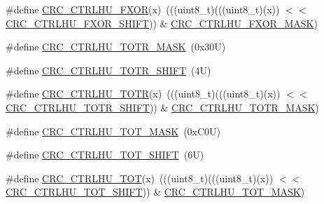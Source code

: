 \begin{DoxyCompactItemize}
\item 
\#define \mbox{\hyperlink{group___c_r_c___register___masks_ga807b19953a7dae113ae149901d5bc58d}{C\+R\+C\+\_\+\+C\+T\+R\+L\+H\+U\+\_\+\+F\+X\+OR}}(x)~(((uint8\+\_\+t)(((uint8\+\_\+t)(x)) $<$$<$ \mbox{\hyperlink{group___c_r_c___register___masks_ga505ca51d1aad1610b44bad4580f2637f}{C\+R\+C\+\_\+\+C\+T\+R\+L\+H\+U\+\_\+\+F\+X\+O\+R\+\_\+\+S\+H\+I\+FT}})) \& \mbox{\hyperlink{group___c_r_c___register___masks_ga0a552f60712b28cd96e939d4324157df}{C\+R\+C\+\_\+\+C\+T\+R\+L\+H\+U\+\_\+\+F\+X\+O\+R\+\_\+\+M\+A\+SK}})
\item 
\#define \mbox{\hyperlink{group___c_r_c___register___masks_ga0418249380c6e69fc9a949f8da4e60f1}{C\+R\+C\+\_\+\+C\+T\+R\+L\+H\+U\+\_\+\+T\+O\+T\+R\+\_\+\+M\+A\+SK}}~(0x30\+U)
\item 
\#define \mbox{\hyperlink{group___c_r_c___register___masks_ga991fefda83335d188d0cc82f1e64f43e}{C\+R\+C\+\_\+\+C\+T\+R\+L\+H\+U\+\_\+\+T\+O\+T\+R\+\_\+\+S\+H\+I\+FT}}~(4\+U)
\item 
\#define \mbox{\hyperlink{group___c_r_c___register___masks_ga93d5a2251369091d34c8cca12d716c2b}{C\+R\+C\+\_\+\+C\+T\+R\+L\+H\+U\+\_\+\+T\+O\+TR}}(x)~(((uint8\+\_\+t)(((uint8\+\_\+t)(x)) $<$$<$ \mbox{\hyperlink{group___c_r_c___register___masks_ga991fefda83335d188d0cc82f1e64f43e}{C\+R\+C\+\_\+\+C\+T\+R\+L\+H\+U\+\_\+\+T\+O\+T\+R\+\_\+\+S\+H\+I\+FT}})) \& \mbox{\hyperlink{group___c_r_c___register___masks_ga0418249380c6e69fc9a949f8da4e60f1}{C\+R\+C\+\_\+\+C\+T\+R\+L\+H\+U\+\_\+\+T\+O\+T\+R\+\_\+\+M\+A\+SK}})
\item 
\#define \mbox{\hyperlink{group___c_r_c___register___masks_gac2999b1c162cd0860f76f002ead704ad}{C\+R\+C\+\_\+\+C\+T\+R\+L\+H\+U\+\_\+\+T\+O\+T\+\_\+\+M\+A\+SK}}~(0x\+C0\+U)
\item 
\#define \mbox{\hyperlink{group___c_r_c___register___masks_ga079a05fc69d357e3fadfb07de8abbeee}{C\+R\+C\+\_\+\+C\+T\+R\+L\+H\+U\+\_\+\+T\+O\+T\+\_\+\+S\+H\+I\+FT}}~(6\+U)
\item 
\#define \mbox{\hyperlink{group___c_r_c___register___masks_ga190812e0be1bc09b3f29bf3c139140ad}{C\+R\+C\+\_\+\+C\+T\+R\+L\+H\+U\+\_\+\+T\+OT}}(x)~(((uint8\+\_\+t)(((uint8\+\_\+t)(x)) $<$$<$ \mbox{\hyperlink{group___c_r_c___register___masks_ga079a05fc69d357e3fadfb07de8abbeee}{C\+R\+C\+\_\+\+C\+T\+R\+L\+H\+U\+\_\+\+T\+O\+T\+\_\+\+S\+H\+I\+FT}})) \& \mbox{\hyperlink{group___c_r_c___register___masks_gac2999b1c162cd0860f76f002ead704ad}{C\+R\+C\+\_\+\+C\+T\+R\+L\+H\+U\+\_\+\+T\+O\+T\+\_\+\+M\+A\+SK}})
\end{DoxyCompactItemize}


